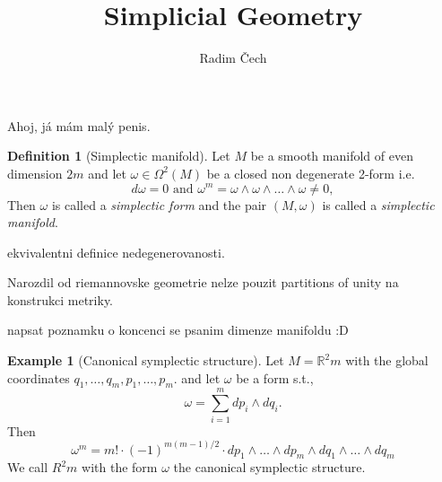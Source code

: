 \documentclass{article}
\title{Simplicial Geometry}
\author{Radim Čech}
\theoremstyle{definition}
\newtheorem{definition}[theorem]{Definition}
\newtheorem{example}[theorem]{Example}
\begin{document}
\maketitle

\noindent Ahoj, já mám malý penis. 

\begin{definition}[Simplectic manifold]
    Let $M$ be a smooth manifold of even dimension $2m$ and let $\omega \in \Omega^2(M)$ be a closed non degenerate 2-form i.e.
    \begin{equation*}
        d\omega = 0 \text{ and } \omega^m = \omega \wedge \omega \wedge \dots \wedge \omega \not = 0,
    \end{equation*}
    Then $\omega$ is called a \textit{simplectic form} and the pair $(M, \omega)$ is called a \textit{simplectic manifold}.
\end{definition}

ekvivalentni definice nedegenerovanosti.

Narozdil od riemannovske geometrie nelze pouzit partitions of unity na konstrukci metriky.

napsat poznamku o koncenci se psanim dimenze manifoldu :D


\begin{example}[Canonical symplectic structure]
    Let $M = \mathbb{R}^2m$ with the global coordinates ${q_1, \dots, q_m, p_1, \dots, p_m}$. and let $\omega$ be a form s.t., 
    \begin{equation*}
        \omega = \sum_{i=1}^m dp_i \wedge dq_i.
    \end{equation*}
    Then 
    \begin{equation*}
        \omega^m = m! \cdot (-1)^{m(m-1)/2} \cdot dp_1 \wedge \dots \wedge dp_m \wedge dq_1 \wedge \dots \wedge dq_m
    \end{equation*}
    We call $R^2m$ with the form $\omega$ the canonical symplectic structure.
\end{example}
\end{document}
